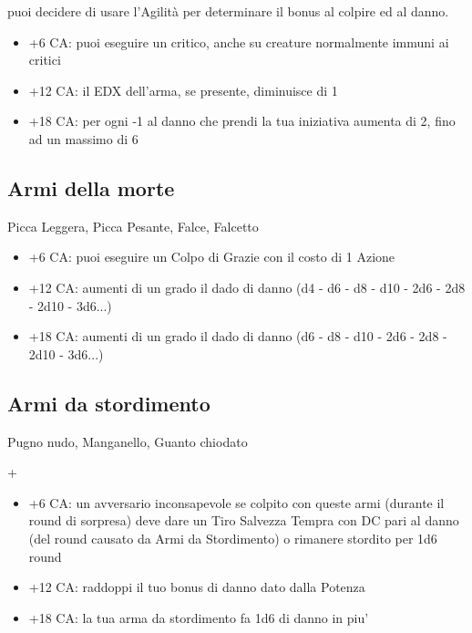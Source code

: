 \documentclass[a4paper,11pt,twoside,openany]{book}
\begin{document}
puoi decidere di usare l'Agilità per determinare il bonus al colpire
ed al danno.

\begin{itemize}
	\item +6 CA: puoi eseguire un critico, anche su creature normalmente immuni
ai critici

\item +12 CA: il EDX dell'arma, se presente, diminuisce di 1

\item +18 CA: per ogni -1 al danno che prendi la tua iniziativa aumenta di 2, fino ad un massimo di 6
\end{itemize}

\subsection{Armi della morte} Picca Leggera, Picca Pesante, Falce, Falcetto

\begin{itemize}
	\item +6 CA: puoi eseguire un Colpo di Grazie con il costo di 1 Azione

\item +12 CA: aumenti di un grado il dado di danno (d4 - d6 - d8 - d10 - 2d6 - 2d8 - 2d10 - 3d6...)

\item +18 CA: aumenti di un grado il dado di danno (d6 - d8 - d10 - 2d6 - 2d8 - 2d10 - 3d6...)

\end{itemize}

\subsection{Armi da stordimento} Pugno nudo, Manganello, Guanto chiodato

+\begin{itemize}
\item +6 CA: un avversario inconsapevole se colpito con queste armi (durante il round di sorpresa) deve dare un Tiro Salvezza Tempra con DC pari al danno (del round causato da Armi da Stordimento) o rimanere stordito per 1d6 round

\item +12 CA: raddoppi il tuo bonus di danno dato dalla Potenza

\item +18 CA: la tua arma da stordimento fa 1d6 di danno in piu'
\end{itemize}
\end{document}
